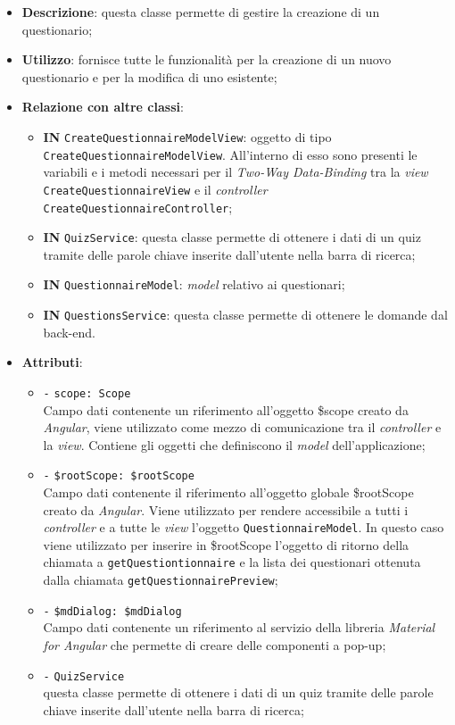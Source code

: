 \begin{itemize}
	\item \textbf{Descrizione}: questa classe permette di gestire la creazione di un questionario;
	\item \textbf{Utilizzo}: fornisce tutte le funzionalità per la creazione di un nuovo questionario e per la modifica di uno esistente;
	\item \textbf{Relazione con altre classi}:
	\begin{itemize}
		\item \textbf{IN} \texttt{CreateQuestionnaireModelView}: oggetto di tipo \texttt{CreateQuestionnaireModelView}. All'interno di esso sono presenti le variabili e i metodi necessari per il \textit{Two-Way Data-Binding} tra la \textit{view} \texttt{CreateQuestionnaireView} e il \textit{controller} \\ \texttt{CreateQuestionnaireController}; 
		\item \textbf{IN} \texttt{QuizService}: questa classe permette di ottenere i dati di un quiz tramite delle parole chiave inserite dall'utente nella barra di ricerca;
		\item \textbf{IN} \texttt{QuestionnaireModel}: \textit{model} relativo ai questionari;
		\item \textbf{IN} \texttt{QuestionsService}: questa classe permette di ottenere le domande dal back-end.
	\end{itemize}
	\item \textbf{Attributi}:
	\begin{itemize}
		\item \texttt{-} \texttt{scope: Scope} \\
		Campo dati contenente un riferimento all'oggetto \$scope creato da \textit{Angular}, viene utilizzato come mezzo di comunicazione tra il \textit{controller} e la \textit{view}. Contiene gli oggetti che definiscono il \textit{model} dell'applicazione;
		\item \texttt{-} \texttt{\$rootScope: \$rootScope} \\
		Campo dati contenente il riferimento all'oggetto globale \$rootScope creato da \textit{Angular}. Viene utilizzato per rendere accessibile a tutti i \textit{controller} e a tutte le \textit{view} l'oggetto \texttt{QuestionnaireModel}. In questo caso viene utilizzato per inserire in \$rootScope l'oggetto di ritorno della chiamata a \texttt{getQuestiontionnaire} e la lista dei questionari ottenuta dalla chiamata \texttt{getQuestionnairePreview};
		\item \texttt{-} \texttt{\$mdDialog: \$mdDialog} \\
		Campo dati contenente un riferimento al servizio della libreria \textit{Material for Angular} che permette di creare delle componenti a pop-up;
		\item \texttt{-} \texttt{QuizService} \\ questa classe permette di ottenere i dati di un quiz tramite delle parole chiave inserite dall'utente nella barra di ricerca;
		

\end{itemize}
\end{itemize}
